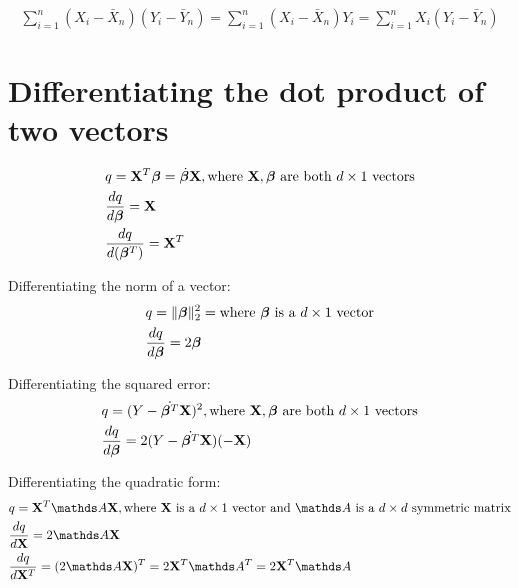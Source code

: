 \begin {equation} \begin {split}
\sum \limits_{i=1}^{n}(X_i - \bar X_n)(Y_i - \bar Y_n) = \sum \limits_{i=1}^{n}(X_i - \bar X_n)Y_i = \sum \limits_{i=1}^{n}X_i(Y_i - \bar Y_n)
\end {split} \end {equation}

\section {Differentiating the dot product of two vectors}
\begin {equation} \begin {split}
& q = \mathbf{X}^T \bm{\beta} = \dot {\bm{\beta}} {\mathbf{X}} , \text {where $\mathbf{X}, \bm{\beta}$ are both $d \times 1$ vectors} \\
& \frac {dq} {d \bm{\beta}} = \mathbf{X} \\
& \frac {dq} {d (\bm{\beta}^T)} = \mathbf{X}^T \\
\end {split} \end {equation}

Differentiating the norm of a vector:
\begin {equation} \begin {split}
& q = \|\bm{\beta}\|_2^2 =  \text {where $\bm{\beta}$ is a $d \times 1$ vector} \\
& \frac {dq} {d \bm{\beta}} = 2 \bm{\beta} \\
\end {split} \end {equation}

Differentiating the squared error:
\begin {equation} \begin {split}
& q = (Y - \dot {\bm{\beta}^T} {\mathbf{X}})^2, \text {where $\mathbf{X}, \bm{\beta}$ are both $d \times 1$ vectors} \\
& \frac {dq} {d \bm{\beta}} = 2 (Y - \dot {\bm{\beta}^T} {\mathbf{X}}) (- \mathbf{X}) \\
\end {split} \end {equation}

Differentiating the quadratic form:
\begin {equation} \begin {split}
& q = \vX^T \mA \vX, \text {where $\vX$ is a $d \times 1$ vector and $\mA$ is a $d \times d$ symmetric matrix} \\
& \frac {dq} {d \vX} = 2 \mA \vX \\
& \frac {dq} {d \vX^T} = (2 \mA \vX)^T = 2 \vX^T \mA^T = 2 \vX^T \mA \\
\end {split} \end {equation}

